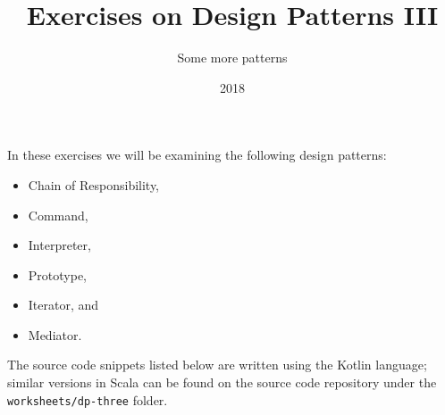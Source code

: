 \documentclass[12pt,a4paper]{exam}
\title{Exercises on Design Patterns III}
\author{Some more patterns}
\date{2018}
\begin{document}
\maketitle

In these exercises we will be examining the following design patterns:
\begin{itemize}
\item Chain of Responsibility,
\item Command,
\item Interpreter,
\item Prototype,
\item Iterator, and
\item Mediator.
\end{itemize}

The source code snippets listed below are written using the Kotlin language; similar versions in Scala can be 
found on the source code repository under the \verb!worksheets/dp-three! folder. 
\end{document}
